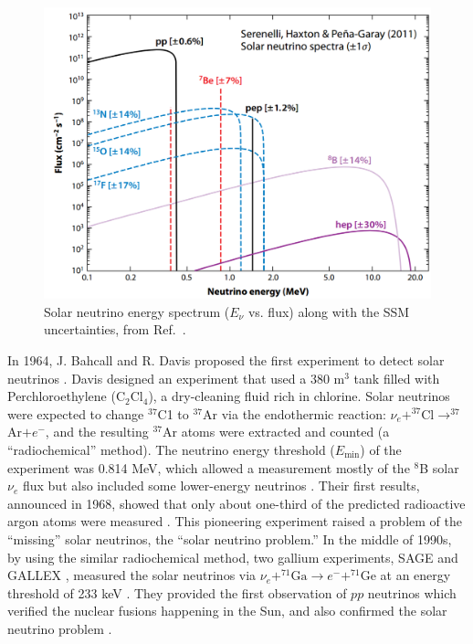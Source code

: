 \begin{figure}[htbp]
	\centering	
	\includegraphics[width=12cm]{haxton09.png}
	\caption[Solar neutrino energy spectrum.]{Solar neutrino energy spectrum ($E_\nu$ vs. flux) along with the SSM uncertainties, from Ref.~\cite{haxton2013solar}.}
	\label{fig:haxton2013plot}
\end{figure}
In 1964, J. Bahcall and R. Davis proposed the first experiment to detect solar neutrinos \cite{bahcall1964solar,davis1964solar}. Davis designed an experiment that used a 380 m$^3$ tank filled with Perchloroethylene (C$_2$Cl$_4$), a dry-cleaning fluid rich in chlorine. Solar neutrinos were expected to change $^{37}$C1 to $^{37}$Ar via the endothermic reaction: $\nu_e+^{37}$Cl$\to^{37}$Ar$+e^-$, and the resulting $^{37}$Ar atoms were extracted and counted (a ``radiochemical'' method). The neutrino energy threshold ($E_{\mathrm{min}}$) of the experiment was 0.814 MeV, which allowed a measurement mostly of the $^8$B solar $\nu_e$ flux but also included some lower-energy neutrinos \cite{davis1964solar}. Their first results, announced in 1968, showed that only about one-third of the predicted radioactive argon atoms were measured \cite{davis1968search}. This pioneering experiment raised a problem of the ``missing'' solar neutrinos, the ``solar neutrino problem.'' In the middle of 1990s, by using the similar radiochemical method, two gallium experiments, SAGE \cite{gavrin2011russian} and GALLEX \cite{hampel1999gallex}, measured the solar neutrinos via $\nu_e+^{71}\mathrm{Ga} \to e^- + ^{71}\mathrm{Ge}$ at an energy threshold of 233 keV \cite{suzuki2020sun}. They provided the first observation of $pp$ neutrinos which verified the nuclear fusions happening in the Sun, and also confirmed the solar neutrino problem \cite{suzuki2020sun,zuber2020neutrino}.

